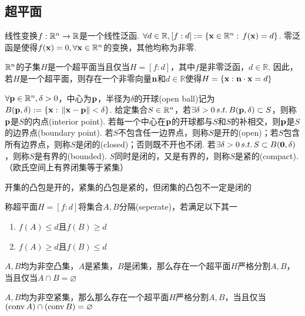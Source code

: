 \subsection{超平面}
\begin{definition}
线性变换$f:\mathbb{R}^n\to\mathbb{R}$是一个线性泛函. $\forall d\in\mathbb{R},[f:d]:=\{\mathbf{x}\in\mathbb{R}^n:\,f(\mathbf{x})=d\}$. 零泛函是使得$f(\mathbf{x})=0,\forall\mathbf{x}\in\mathbb{R}^n$的变换，其他均称为非零.
\end{definition}
\begin{theorem}
$\mathbb{R}^n$的子集$H$是一个超平面当且仅当$H=[f:d]$，其中$f$是非零泛函，$d\in\mathbb{R}$. 因此，若$H$是一个超平面，则存在一个非零向量$\mathbf{n}$和$d\in\mathbb{R}$使得$H=\{\mathbf{x}:\mathbf{n}\cdot\mathbf{x}=d\}$
\end{theorem}
\begin{definition}[拓扑概念]
\rm $\forall\mathbf{p}\in\mathbb{R}^n,\delta>0$，中心为$\mathbf{p}$，半径为$\delta$的开球(open ball)记为$B(\mathbf{p},\delta):=\{\mathbf{x}:\,\|\mathbf{x}-\mathbf{p}\|<\delta\}$. 给定集合$S\in\mathbb{R}^n$，若$\exists\delta>0\,s.t.\,B(\mathbf{p},\delta)\subset S$，则称$\mathbf{p}$是$S$的内点(interior point). 若每一个中心在$\mathbf{p}$的开球都与$S$和$S$的补相交，则$\mathbf{p}$是$S$的边界点(boundary point). 若$S$不包含任一边界点，则称$S$是开的(open)；若$S$包含所有边界点，则称$S$是闭的(closed)；否则既不开也不闭. 若$\exists\delta>0\,s.t.\,S\subset B(\mathbf{0},\delta)$，则称$S$是有界的(bounded). $S$同时是闭的，又是有界的，则称$S$是紧的(compact).（欧氏空间上有界闭集等于紧集）
\end{definition}
\begin{theorem}
开集的凸包是开的，紧集的凸包是紧的，但闭集的凸包不一定是闭的
\end{theorem}
\begin{definition}
\rm 称超平面$H=[f:d]$将集合$A,B$分隔(seperate)，若满足以下其一
\begin{enumerate}
	\itemsep -3pt
	\item $f(A)\leq d$且$f(B)\geq d$
	\item $f(A)\geq d$且$f(B)\leq d$
\end{enumerate}
\end{definition}
\begin{theorem}
$A,B$均为非空凸集，$A$是紧集，$B$是闭集，那么存在一个超平面$H$严格分割$A,B$，当且仅当$A\cap B=\varnothing$
\end{theorem}
\begin{theorem}
$A,B$均为非空紧集，那么那么存在一个超平面$H$严格分割$A,B$，当且仅当$(\mathrm{conv}\, A)\cap (\mathrm{conv}\, B)=\varnothing$
\end{theorem}

